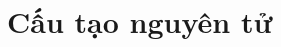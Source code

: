 \documentclass[Main.tex]{subfiles}
\begin{document}
	\hienthiloigiai
	\chapter{Cấu tạo nguyên tử}
		
		
		
\end{document}
